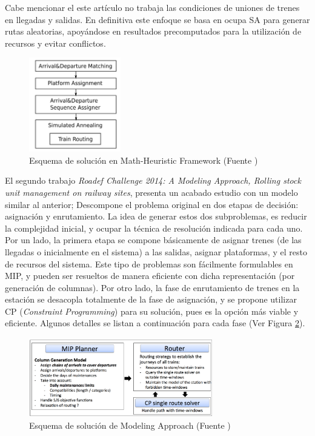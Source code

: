 \documentclass[letter, 10pt]{article}
\begin{document}
\begin{description}
\begin{enumerate}
    \end{enumerate}
    Cabe mencionar el este artículo no trabaja las condiciones de uniones de trenes en llegadas y salidas. En definitiva este enfoque se basa en ocupa SA para generar rutas aleatorias, apoyándose en resultados precomputados para la utilización de recursos y evitar conflictos.
    \begin{figure}[htpb!]
    \centering
    \includegraphics[width=4cm]{diagram}
    \caption{Esquema de solución en Math-Heuristic Framework (Fuente \cite{MathHeuristic})}
    \label{fig:diagram}
    \end{figure}

    El segundo trabajo \textit{Roadef Challenge 2014: A Modeling Approach, Rolling stock unit management on railway sites}\cite{ModelingApproach}, presenta un acabado estudio con un modelo similar al anterior; Descompone el problema original en dos etapas de decisión: asignación y enrutamiento. La idea de generar estos dos subproblemas, es reducir la complejidad inicial, y ocupar la técnica de resolución indicada para cada uno. Por un lado, la primera etapa se compone básicamente de asignar trenes (de las llegadas o inicialmente en el sistema) a las salidas, asignar plataformas, y el resto de recursos del sistema. Este tipo de problemas son fácilmente formulables en MIP, y pueden ser resueltos de manera eficiente con dicha representación (por generación de columnas). Por otro lado, la fase de enrutamiento de trenes en la estación se desacopla totalmente de la fase de asignación, y se propone utilizar CP (\textit{Constraint Programming}) para su solución, pues es la opción más viable y eficiente. Algunos detalles se listan a continuación para cada fase (Ver Figura \ref{fig:diagram2}).
     \begin{figure}[htpb!]
    \centering
    \includegraphics[width=8cm]{diagram2}
    \caption{Esquema de solución de Modeling Approach (Fuente \cite{ModelingApproach})}
    \label{fig:diagram2}
    \end{figure}


\end{description}
\end{document}
